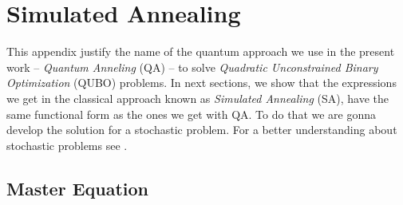
\chapter{Simulated Annealing} %

This appendix justify the name of the quantum approach we use in the present work -- \textit{Quantum Anneling} (QA) -- to solve \textit{Quadratic Unconstrained Binary Optimization} (QUBO) problems. In next sections, we show that the expressions we get in the classical approach known as \textit{Simulated Annealing} (SA), have the same functional form as the ones we get with QA. To do that we are gonna develop the solution for a stochastic problem. For a better understanding about stochastic problems see \cite{Schneider2006StochasticOptimization}. 
\label{AppendixB} %
\section{Master Equation}
